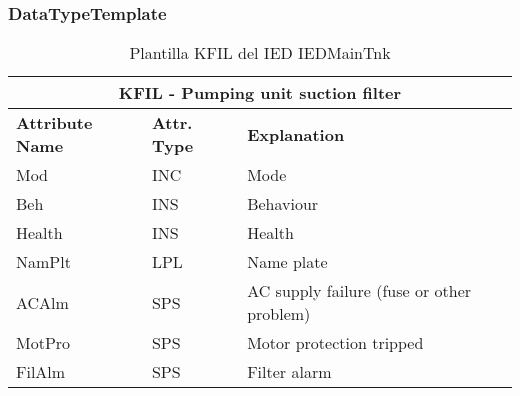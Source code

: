     \subsubsection{DataTypeTemplate}
    \begin{table}[H]
    \begin{center}
    \begin{tabular}{|l|l|p{8.5cm}|}
            \hline
            \multicolumn{3}{|c|}{\cellcolor[gray]{0.8} \textbf{ KFIL}  - Pumping unit suction filter} \\
            \hline
            \textbf{Attribute Name} & \textbf{Attr. Type} & \textbf{Explanation} \\
            \hline 
            Mod & INC & Mode \\
            \hline
            Beh & INS & Behaviour \\
            \hline
            Health & INS & Health \\
            \hline
            NamPlt & LPL & Name plate \\
            \hline
            ACAlm & SPS & AC supply failure (fuse or other problem) \\
            \hline
            MotPro & SPS & Motor protection tripped \\
            \hline
            FilAlm & SPS & Filter alarm \\
            \hline
    \end{tabular}
    \caption{Plantilla KFIL del IED IEDMainTnk}
    \label{table:lnTypeKFIL_29}
    \end{center}
    \end{table}
    
    
    